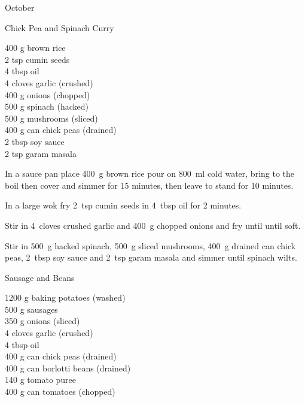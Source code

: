 \begin{menu}{October}
    \begin{recipe}{2}{Chick Pea and Spinach Curry}%
		\begin{ingredients}
		400 g brown rice  \\
	2 tsp cumin seeds  \\
	4 tbsp oil  \\
	4 cloves garlic (crushed) \\
	400 g onions (chopped) \\
	500 g spinach (hacked) \\
	500 g mushrooms (sliced) \\
	400 g can chick peas (drained) \\
	2 tbsp soy sauce  \\
	2 tsp garam masala  \\
	
		\end{ingredients}
	
	
	
    \begin{instructions}
    \item 
    In a
    sauce pan
    place
    400~g  brown rice
    pour on
    800~ml  cold water,
    bring to the boil then cover and simmer for 15 minutes,
    then leave to stand for 10 minutes.
  \item 
        In a large wok fry
        2~tsp  cumin seeds
        in
        4~tbsp  oil
        for 2 minutes.
      \item 
        Stir in
        4~cloves crushed garlic
        and
        400~g chopped onions
        and fry until until soft.
      \item 
        Stir in
        500~g hacked spinach,
        500~g sliced mushrooms,
        400~g drained can chick peas,
        2~tbsp  soy sauce
        and
        2~tsp  garam masala
        and simmer until spinach wilts.
      
    \end{instructions}
    \end{recipe}%
  
    \begin{recipe}{2}{Sausage and Beans}%
		\begin{ingredients}
		1200 g baking potatoes (washed) \\
	500 g sausages  \\
	350 g onions (sliced) \\
	4 cloves garlic (crushed) \\
	4 tbsp oil  \\
	400 g can chick peas (drained) \\
	400 g can borlotti beans (drained) \\
	140 g tomato puree  \\
	400 g can tomatoes (chopped) \\
	

\end{ingredients}
\end{recipe}
\end{menu}
